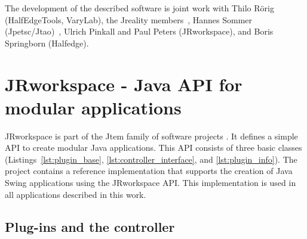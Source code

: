 \documentclass[Thesis.tex]{subfiles}
\begin{document}
The development of the described software is joint work with Thilo R{\" o}rig 
({\sc HalfEdgeTools, VaryLab}), the {\sc Jreality} members~\cite{JrealityWebsite}, Hannes 
Sommer ({\sc Jpetsc/Jtao})~\cite{jpetsctao-web-page}, Ulrich Pinkall and Paul Peters 
({\sc JRworkspace}), and Boris Springborn ({\sc Halfedge}).

%
%
%


\chapter{{\sc JRworkspace} - Java API for modular applications}
\label{chp:jrworkspace}


{\sc JRworkspace} is part of the {\sc Jtem} family of software projects 
\cite{JtemWebsite}. It defines a simple API to create modular Java applications. This API consists of
three basic classes (Listings~\ref{lst:plugin_base}, \ref{lst:controller_interface}, and 
\ref{lst:plugin_info}).
The project contains a reference implementation that supports the creation of Java
Swing applications using the {\sc JRworkspace} API. This implementation is used in all 
applications described in this work.

\section{Plug-ins and the controller}
\label{sec:plugins}
\end{document}

